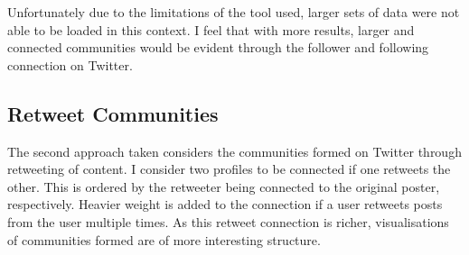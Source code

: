 Unfortunately due to the limitations of the tool used, larger sets of data were not able to be loaded in this context. I feel that with more results, larger and connected communities would be evident through the follower and following connection on Twitter.

\subsection{Retweet Communities}

The second approach taken considers the communities formed on Twitter through retweeting of content. I consider two profiles to be connected if one retweets the other. This is ordered by the retweeter being connected to the original poster, respectively. Heavier weight is added to the connection if a user retweets posts from the user multiple times. As this retweet connection is richer, visualisations of communities formed are of more interesting structure. 

